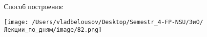 \documentclass[12pt, a4paper]{report}
\begin{document}
Способ построения: 

\begin{center}
    \texttt{[image: /Users/vladbelousov/Desktop/Semestr\_4-FP-NSU/ЭиО/Лекции\_по\_дням/image/82.png]}
\end{center} 


\ifdefined\mainfile
\else
    
\end{document}
